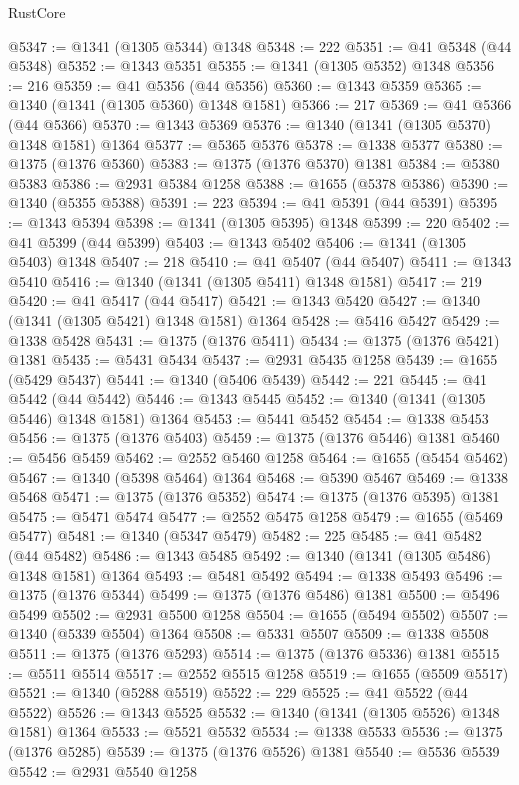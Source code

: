 \begin{lexlean}{RustCore}
\begin{coremodule}
@5347 := @1341 (@1305 @5344) @1348
@5348 := 222
@5351 := @41 @5348 (@44 @5348)
@5352 := @1343 @5351
@5355 := @1341 (@1305 @5352) @1348
@5356 := 216
@5359 := @41 @5356 (@44 @5356)
@5360 := @1343 @5359
@5365 := @1340 (@1341 (@1305 @5360) @1348 @1581)
@5366 := 217
@5369 := @41 @5366 (@44 @5366)
@5370 := @1343 @5369
@5376 := @1340 (@1341 (@1305 @5370) @1348 @1581) @1364
@5377 := @5365 @5376
@5378 := @1338 @5377
@5380 := @1375 (@1376 @5360)
@5383 := @1375 (@1376 @5370) @1381
@5384 := @5380 @5383
@5386 := @2931 @5384 @1258
@5388 := @1655 (@5378 @5386)
@5390 := @1340 (@5355 @5388)
@5391 := 223
@5394 := @41 @5391 (@44 @5391)
@5395 := @1343 @5394
@5398 := @1341 (@1305 @5395) @1348
@5399 := 220
@5402 := @41 @5399 (@44 @5399)
@5403 := @1343 @5402
@5406 := @1341 (@1305 @5403) @1348
@5407 := 218
@5410 := @41 @5407 (@44 @5407)
@5411 := @1343 @5410
@5416 := @1340 (@1341 (@1305 @5411) @1348 @1581)
@5417 := 219
@5420 := @41 @5417 (@44 @5417)
@5421 := @1343 @5420
@5427 := @1340 (@1341 (@1305 @5421) @1348 @1581) @1364
@5428 := @5416 @5427
@5429 := @1338 @5428
@5431 := @1375 (@1376 @5411)
@5434 := @1375 (@1376 @5421) @1381
@5435 := @5431 @5434
@5437 := @2931 @5435 @1258
@5439 := @1655 (@5429 @5437)
@5441 := @1340 (@5406 @5439)
@5442 := 221
@5445 := @41 @5442 (@44 @5442)
@5446 := @1343 @5445
@5452 := @1340 (@1341 (@1305 @5446) @1348 @1581) @1364
@5453 := @5441 @5452
@5454 := @1338 @5453
@5456 := @1375 (@1376 @5403)
@5459 := @1375 (@1376 @5446) @1381
@5460 := @5456 @5459
@5462 := @2552 @5460 @1258
@5464 := @1655 (@5454 @5462)
@5467 := @1340 (@5398 @5464) @1364
@5468 := @5390 @5467
@5469 := @1338 @5468
@5471 := @1375 (@1376 @5352)
@5474 := @1375 (@1376 @5395) @1381
@5475 := @5471 @5474
@5477 := @2552 @5475 @1258
@5479 := @1655 (@5469 @5477)
@5481 := @1340 (@5347 @5479)
@5482 := 225
@5485 := @41 @5482 (@44 @5482)
@5486 := @1343 @5485
@5492 := @1340 (@1341 (@1305 @5486) @1348 @1581) @1364
@5493 := @5481 @5492
@5494 := @1338 @5493
@5496 := @1375 (@1376 @5344)
@5499 := @1375 (@1376 @5486) @1381
@5500 := @5496 @5499
@5502 := @2931 @5500 @1258
@5504 := @1655 (@5494 @5502)
@5507 := @1340 (@5339 @5504) @1364
@5508 := @5331 @5507
@5509 := @1338 @5508
@5511 := @1375 (@1376 @5293)
@5514 := @1375 (@1376 @5336) @1381
@5515 := @5511 @5514
@5517 := @2552 @5515 @1258
@5519 := @1655 (@5509 @5517)
@5521 := @1340 (@5288 @5519)
@5522 := 229
@5525 := @41 @5522 (@44 @5522)
@5526 := @1343 @5525
@5532 := @1340 (@1341 (@1305 @5526) @1348 @1581) @1364
@5533 := @5521 @5532
@5534 := @1338 @5533
@5536 := @1375 (@1376 @5285)
@5539 := @1375 (@1376 @5526) @1381
@5540 := @5536 @5539
@5542 := @2931 @5540 @1258

\end{coremodule}
\end{lexlean}
